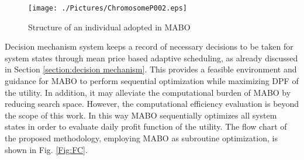 \documentclass[journal]{IEEEtran}
\begin{document}
%
\begin{figure}
	\centering
	\texttt{[image: ./Pictures/ChromosomeP002.eps]}
	\vspace{-0.1cm}
	\caption{Structure of an individual adopted in MABO\vspace{-0.4cm}}
	\label{Figure:generalized chromosome}
\end{figure}
\par Decision mechanism system keeps a record of necessary decisions to be taken for system states through mean price based adaptive scheduling, as already discussed in Section \ref{section:decision mechanism}. This provides a feasible environment and guidance for MABO to perform sequential optimization while maximizing DPF of the utility. In addition, it may alleviate the computational burden of MABO by reducing search space. However, the computational efficiency evaluation is beyond the scope of this work. In this way MABO sequentially optimizes all system states in order to evaluate daily profit function of the utility. The flow chart of the proposed methodology, employing MABO as subroutine optimization, is shown in Fig. \ref{Fig:FC}.
\end{document}
